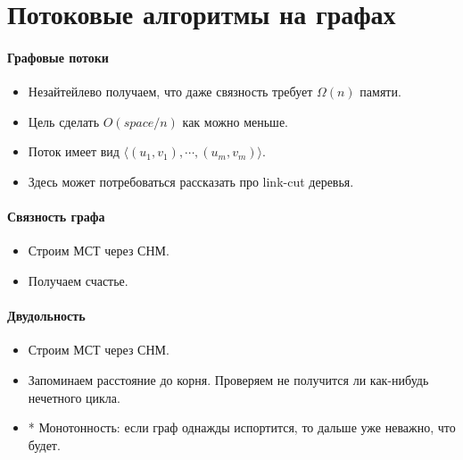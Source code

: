 \section{Потоковые алгоритмы на графах} %
\label{sec:graph_stream}

\paragraph{Графовые потоки} %
\label{par:graph_streams}

\begin{itemize}
	\item Незайтейлево получаем, что даже связность требует $\Omega(n)$ памяти.
	\item Цель сделать $O(space \slash n)$ как можно меньше.
	\item Поток имеет вид $\langle (u_1, v_1), \cdots, (u_m, v_m) \rangle$.
	\item Здесь может потребоваться рассказать про link-cut деревья.
\end{itemize}


\paragraph{Связность графа} %
\label{par:connectedness}

\begin{itemize}
	\item Строим МСТ через СНМ.
	\item Получаем счастье.
\end{itemize}


\paragraph{Двудольность} %
\label{par:bipartite}

\begin{itemize}
	\item Строим МСТ через СНМ.
	\item Запоминаем расстояние до корня. Проверяем не получится ли как-нибудь нечетного цикла.
	\item * Монотонность: если граф однажды испортится, то дальше уже неважно, что будет.
\end{itemize}


